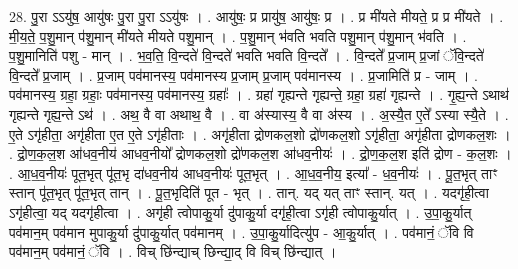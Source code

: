 \documentclass[17pt]{extarticle}
\begin{document}
28. पु॒रा ऽऽयु॑ष॒ आयु॑षः पु॒रा पु॒रा ऽऽयु॑षः । . आयु॑षः॒ प्र प्रायु॑ष॒ आयु॑षः॒ प्र । . प्र मी॑यते मीयते॒ प्र प्र मी॑यते । . मी॒य॒ते॒ प॒शु॒मान् प॑शु॒मान् मी॑यते मीयते पशु॒मान् । . प॒शु॒मान् भ॑वति भवति पशु॒मान् प॑शु॒मान् भ॑वति । . प॒शु॒मानिति॑ पशु - मान् । . भ॒व॒ति॒ वि॒न्दते॑ वि॒न्दते॑ भवति भवति वि॒न्दते᳚ । . वि॒न्दते᳚ प्र॒जाम् प्र॒जां ॅवि॒न्दते॑ वि॒न्दते᳚ प्र॒जाम् । . प्र॒जाम् पव॑मानस्य॒ पव॑मानस्य प्र॒जाम् प्र॒जाम् पव॑मानस्य । . प्र॒जामिति॑ प्र - जाम् । . पव॑मानस्य॒ ग्रहा॒ ग्रहाः॒ पव॑मानस्य॒ पव॑मानस्य॒ ग्रहाः᳚ । . ग्रहा॑ गृह्यन्ते गृह्यन्ते॒ ग्रहा॒ ग्रहा॑ गृह्यन्ते । . गृ॒ह्य॒न्ते ऽथाथ॑ गृह्यन्ते गृह्य॒न्ते ऽथ॑ । . अथ॒ वै वा अथाथ॒ वै । . वा अ॑स्यास्य॒ वै वा अ॑स्य । . अ॒स्यै॒त ए॒ते᳚ ऽस्या स्यै॒ते । . ए॒ते ऽगृ॑हीता॒ अगृ॑हीता ए॒त ए॒ते ऽगृ॑हीताः । . अगृ॑हीता द्रोणकल॒शो द्रो॑णकल॒शो ऽगृ॑हीता॒ अगृ॑हीता द्रोणकल॒शः । . द्रो॒ण॒क॒ल॒श आ॑धव॒नीय॑ आधव॒नीयो᳚ द्रोणकल॒शो द्रो॑णकल॒श आ॑धव॒नीयः॑ । . द्रो॒ण॒क॒ल॒श इति॑ द्रोण - क॒ल॒शः । . आ॒ध॒व॒नीयः॑ पूत॒भृत् पू॑त॒भृ दा॑धव॒नीय॑ आधव॒नीयः॑ पूत॒भृत् । . आ॒ध॒व॒नीय॒ इत्या᳚ - ध॒व॒नीयः॑ । . पू॒त॒भृत् ताꣳ स्तान् पू॑त॒भृत् पू॑त॒भृत् तान् । . पू॒त॒भृदिति॑ पूत - भृत् । . तान्. यद् यत् ताꣳ स्तान्. यत् । . यदगृ॑ही॒त्वा ऽगृ॑हीत्वा॒ यद् यदगृ॑हीत्वा । . अगृ॑ही त्वोपाकु॒र्या दु॑पाकु॒र्या दगृ॑ही॒त्वा ऽगृ॑ही त्वोपाकु॒र्यात् । . उ॒पा॒कु॒र्यात् पव॑मान॒म् पव॑मान मुपाकु॒र्या दु॑पाकु॒र्यात् पव॑मानम् । . उ॒पा॒कु॒र्यादित्यु॑प - आ॒कु॒र्यात् । . पव॑मानं॒ ॅवि वि पव॑मान॒म् पव॑मानं॒ ॅवि । . विच् छि॑न्द्याच् छिन्द्या॒द् वि विच् छि॑न्द्यात् । \newline
\end{document}
